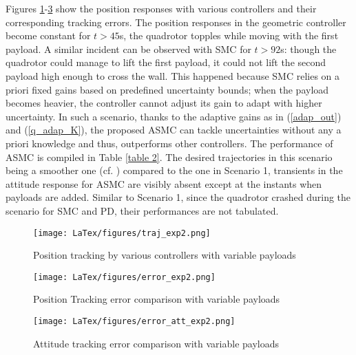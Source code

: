Figures \ref{fig:traj_exp2}-\ref{fig:error_att_exp2} show the position responses with various controllers and their corresponding tracking errors. The position responses in the geometric controller become constant for $t>45$s, the quadrotor topples while moving with the first payload. A similar incident can be observed with SMC for $t> 92 $s: though the quadrotor could manage to lift the first payload, it could not lift the second payload high enough to cross the wall. This happened because SMC relies on a priori fixed gains based on predefined uncertainty bounds; when the payload becomes heavier, the controller cannot adjust its gain to adapt with higher uncertainty. In such a scenario, thanks to the adaptive gains as in (\ref{adap_out}) and (\ref{q_adap_K}), the proposed ASMC can tackle uncertainties without any a priori knowledge and thus, outperforms other controllers. The performance of ASMC is compiled in Table \ref{table 2}. The desired trajectories in this scenario being a smoother one (cf. \cite{mellinger2011minimum}) compared to the one in Scenario 1, transients in the attitude response for ASMC are visibly absent except at the instants when payloads are added. Similar to Scenario 1, since the quadrotor crashed during the scenario for SMC and PD, their performances are not tabulated.



\begin{figure}
    \texttt{[image: LaTex/figures/traj\_exp2.png]}
    \centering
    \caption{Position tracking by various controllers with variable payloads}
    \label{fig:traj_exp2}
\end{figure}
\begin{figure}
    \texttt{[image: LaTex/figures/error\_exp2.png]}
    \centering
    \caption{Position Tracking error comparison with variable payloads}
    \label{fig:error_exp2}
\end{figure}
\begin{figure}
    \texttt{[image: LaTex/figures/error\_att\_exp2.png]}
    \centering
    \caption{Attitude tracking error comparison with variable payloads}
    \label{fig:error_att_exp2}
\end{figure}


